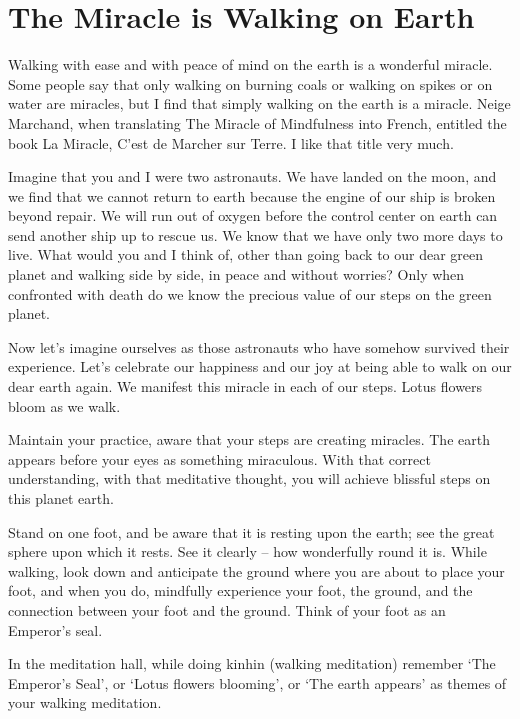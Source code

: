 \documentclass[a4paper,12pt,twocolumn]{article}
\begin{document}
    

  \section{The Miracle is Walking on Earth}

  Walking with ease and with peace of mind on the earth is a wonderful miracle.  Some people say that only walking on burning coals or walking on spikes or on water are miracles, but I find that simply walking on the earth is a miracle.  Neige Marchand, when translating The Miracle of Mindfulness into French, entitled the book La Miracle, C’est de Marcher sur Terre.  I like that title very much.

  Imagine that you and I were two astronauts.  We have landed on the moon, and we find that we cannot return to earth because the engine of our ship is broken beyond repair.  We will run out of oxygen before the control center on earth can send another ship up to rescue us.  We know that we have only two more days to live.  What would you and I think of, other than going back to our dear green planet and walking side by side, in peace and without worries?  Only when confronted with death do
  we know the precious value of our steps on the green planet. 

  Now let’s imagine ourselves as those astronauts who have somehow survived their experience.  Let’s celebrate our happiness and our joy at being able to walk on our dear earth again.  We manifest this miracle in each of our steps.  Lotus flowers bloom as we walk.

  Maintain your practice, aware that your steps are creating miracles.  The earth appears before your eyes as something miraculous.  With that correct understanding, with that meditative thought, you will achieve blissful steps on this planet earth.

  Stand on one foot, and be aware that it is resting upon the earth; see the great sphere upon which it rests.  See it clearly – how wonderfully round it is.  While walking, look down and anticipate the ground where you are about to place your foot, and when you do, mindfully experience your foot, the ground, and the connection between your foot and the ground.  Think of your foot as an Emperor’s seal.

  In the meditation hall, while doing kinhin (walking meditation) remember ‘The Emperor’s Seal’, or ‘Lotus flowers blooming’, or ‘The earth appears’ as themes of your walking meditation.
  
\end{document}
